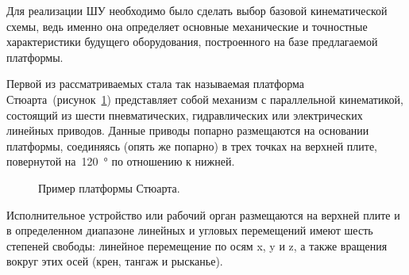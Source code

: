 Для реализации ШУ необходимо было сделать выбор базовой кинематической схемы, ведь именно она определяет основные механические и точностные характеристики будущего оборудования, построенного на базе предлагаемой платформы.

Первой из рассматриваемых стала так называемая платформа Стюарта~(рисунок~\cref{fig:stuart}) представляет собой механизм с параллельной кинематикой, состоящий из шести пневматических, гидравлических или электрических линейных приводов. Данные приводы попарно размещаются на основании платформы, соединяясь (опять же попарно) в трех точках на верхней плите, повернутой на~\SI{120}{\degree} по отношению к нижней.

\begin{figure}[ht]
	\caption{Пример платформы Стюарта.}\label{fig:stuart}
\end{figure}

Исполнительное устройство или рабочий орган размещаются на верхней плите и в определенном диапазоне линейных и угловых перемещений имеют шесть степеней свободы: линейное перемещение по осям x, y и z, а также вращения вокруг этих осей (крен, тангаж и рысканье).

